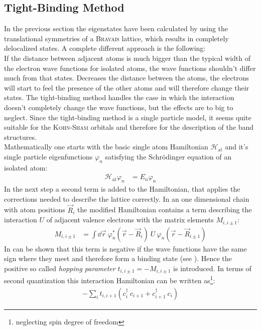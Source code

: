 \subsection{Tight-Binding Method}
In the previous section the eigenstates have been calculated by using the translational symmetries of a \textsc{Bravais} lattice, which results in completely delocalized states. A complete different approach is the following:\\
If the distance between adjacent atoms is much bigger than the typical width of the electron wave functions for isolated atoms, the wave functions shouldn't differ much from that states. Decreases the distance between the atoms, the electrons will start to feel the presence of the other atoms and will therefore change their states. The tight-binding method handles the case in which the interaction doesn't completely change the wave functions, but the effects are to big to neglect. Since the tight-binding method is a single particle model, it seems quite suitable for the \textsc{Kohn-Sham} orbitals and therefore for the description of the band structures.\\
Mathematically one starts with the basic single atom Hamiltonian $\mathcal{H}_{\text{at}}$ and it's single particle eigenfunctions $\varphi_n$ satisfying the Schrödinger equation of an isolated atom:
\begin{align}
	\mathcal{H}_{\text{at}} \varphi_n &= E_n \varphi_n
\end{align}
In the next step a second term is added to the Hamiltonian, that applies the corrections needed to describe the lattice correctly. In an one dimensional chain with atom positions $\vec{R}_i$ the modified Hamiltonian contains a term describing the interaction $U$ of adjacent valence electrons with the matrix elements $M_{i, i\pm1}$:
\begin{align}
	M_{i, i\pm1} &= \int\dd\vec{r}\ \varphi_n^*\left(\vec{r} - \vec{R}_i\right)\ U\ \varphi_n\left(\vec{r}-\vec{R}_{i\pm1}\right) 
\end{align}
In can be shown that this term is negative if the wave functions have the same sign where they meet and therefore form a binding state (see \cite{rohrer}). Hence the positive so called \emph{hopping parameter} $t_{i, i\pm 1} = - M_{i, i\pm 1}$ is introduced. In terms of second quantization this interaction Hamiltonian can be written as\footnote{neglecting spin degree of freedom}:
\begin{align}
	- \sum_i t_{i, i+1} \left(c_i^\dagger\  c_{i+1} + c_{i+1}^\dagger\  c_i\right)
\end{align}
